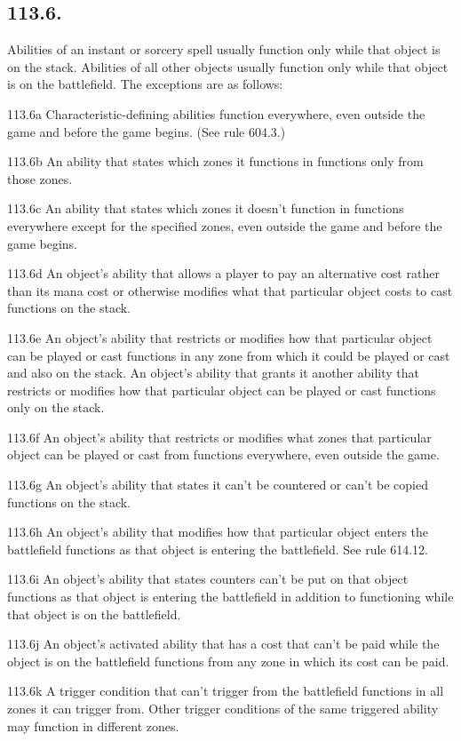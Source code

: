 \subsection*{113.6.}
Abilities of an instant or sorcery spell usually function only while that object is on the stack. Abilities of all other objects usually function only while that object is on the battlefield. The exceptions are as follows:

113.6a Characteristic-defining abilities function everywhere, even outside the game and before the game begins. (See rule 604.3.)

113.6b An ability that states which zones it functions in functions only from those zones.

113.6c An ability that states which zones it doesn’t function in functions everywhere except for the specified zones, even outside the game and before the game begins.

113.6d An object’s ability that allows a player to pay an alternative cost rather than its mana cost or otherwise modifies what that particular object costs to cast functions on the stack.

113.6e An object’s ability that restricts or modifies how that particular object can be played or cast functions in any zone from which it could be played or cast and also on the stack. An object’s ability that grants it another ability that restricts or modifies how that particular object can be played or cast functions only on the stack.

113.6f An object’s ability that restricts or modifies what zones that particular object can be played or cast from functions everywhere, even outside the game.

113.6g An object’s ability that states it can’t be countered or can’t be copied functions on the stack.

113.6h An object’s ability that modifies how that particular object enters the battlefield functions as that object is entering the battlefield. See rule 614.12.

113.6i An object’s ability that states counters can’t be put on that object functions as that object is entering the battlefield in addition to functioning while that object is on the battlefield.

113.6j An object’s activated ability that has a cost that can’t be paid while the object is on the battlefield functions from any zone in which its cost can be paid.

113.6k A trigger condition that can’t trigger from the battlefield functions in all zones it can trigger from. Other trigger conditions of the same triggered ability may function in different zones.

